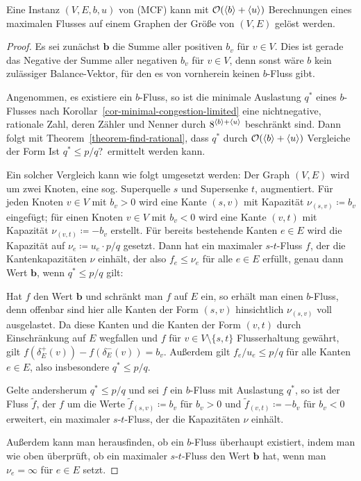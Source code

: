 \begin{theorem}
	Eine Instanz $(V,E,b,u)$ von (MCF) kann mit $\mathcal{O}(\langle b\rangle + \langle u\rangle)$ Berechnungen eines maximalen Flusses auf einem Graphen der Größe von $(V,E)$ gelöst werden.
\end{theorem}
\begin{proof}
	Es sei zunächst $\mathbf{b}$ die Summe aller positiven $b_v$ für $v\in V$.
	Dies ist gerade das Negative der Summe aller negativen $b_v$ für $v\in V$, denn sonst wäre $b$ kein zulässiger Balance-Vektor, für den es von vornherein keinen $b$-Fluss gibt.
	
	Angenommen, es existiere ein $b$-Fluss, so ist die minimale Auslastung $q^*$ eines $b$-Flusses nach Korollar~\ref{cor-minimal-congestion-limited} eine nichtnegative, rationale Zahl, deren Zähler und Nenner durch $8^{\langle b\rangle + \langle u\rangle}$ beschränkt sind.
	Dann folgt mit Theorem~\ref{theorem-find-rational}, dass $q^*$ durch $\mathcal{O}(\langle b\rangle + \langle u\rangle)$ Vergleiche der Form \glqq Ist $q^*\leq p/q$?\grqq\ ermittelt werden kann.
	
	Ein solcher Vergleich kann wie folgt umgesetzt werden:
	Der Graph $(V,E)$ wird um zwei Knoten, eine sog. Superquelle $s$ und Supersenke $t$, augmentiert.
	Für jeden Knoten $v\in V$ mit $b_v > 0$ wird eine Kante $(s,v)$ mit Kapazität $\nu_{(s,v)}\coloneq b_v$ eingefügt; für einen Knoten $v\in V$ mit $b_v < 0$ wird eine Kante $(v,t)$ mit Kapazität $\nu_{(v,t)}\coloneq -b_v$ erstellt.
	Für bereits bestehende Kanten $e\in E$ wird die Kapazität auf $\nu_e \coloneq u_e \cdot p / q$ gesetzt.
	Dann hat ein maximaler $s$-$t$-Fluss $f$, der die Kantenkapazitäten $\nu$ einhält, der also $f_e\leq \nu_e$ für alle $e\in E$ erfüllt, genau dann Wert $\mathbf{b}$, wenn $q^*\leq p/q$ gilt:
	
	Hat $f$ den Wert $\mathbf{b}$ und schränkt man $f$ auf $E$ ein, so erhält man einen $b$-Fluss, denn offenbar sind hier alle Kanten der Form $(s,v)$ hinsichtlich $\nu_{(s,v)}$ voll ausgelastet.
	Da diese Kanten und die Kanten der Form $(v,t)$ durch Einschränkung auf $E$ wegfallen und $f$ für $v\in V\setminus\{ s, t \}$ Flusserhaltung gewährt, gilt $f(\delta^+_E(v)) - f(\delta^-_E(v)) = b_v$.
	Außerdem gilt $f_e/u_e \leq p/q$ für alle Kanten $e\in E$, also insbesondere $q^*\leq p/q$.
	
	Gelte andersherum $q^* \leq p/q$ und sei $f$ ein $b$-Fluss mit Auslastung $q^*$, so ist der Fluss $\tilde{f}$, der $f$ um die Werte $\tilde{f}_{(s,v)}\coloneq b_v$ für $b_v > 0$ und $\tilde{f}_{(v,t)}\coloneq -b_v$ für $b_v < 0$ erweitert, ein maximaler $s$-$t$-Fluss, der die Kapazitäten $\nu$ einhält.
	
	Außerdem kann man herausfinden, ob ein $b$-Fluss überhaupt existiert, indem man wie oben überprüft, ob ein maximaler $s$-$t$-Fluss den Wert $\mathbf{b}$ hat, wenn man $\nu_e=\infty$ für $e\in E$ setzt.
\end{proof}

